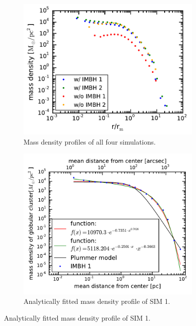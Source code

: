 \begin{figure}[htbp]
	\centering
	\begin{subfigure}{0.475\textwidth}
		\centering
		\includegraphics[width=\textwidth]{Plots/density_profiles.pdf}
		\caption{Mass density profiles of all four simulations.}
		\label{fig:mass_dens_points}
	\end{subfigure}
	\hfill
	\begin{subfigure}{0.475\textwidth}
		\centering
		\includegraphics[width=\textwidth]{Plots/density_prof_analytic.pdf}
		\caption{Analytically fitted mass density profile of SIM 1.}
		\label{fig:mass_dens_ana}

\end{subfigure}
\end{figure}
